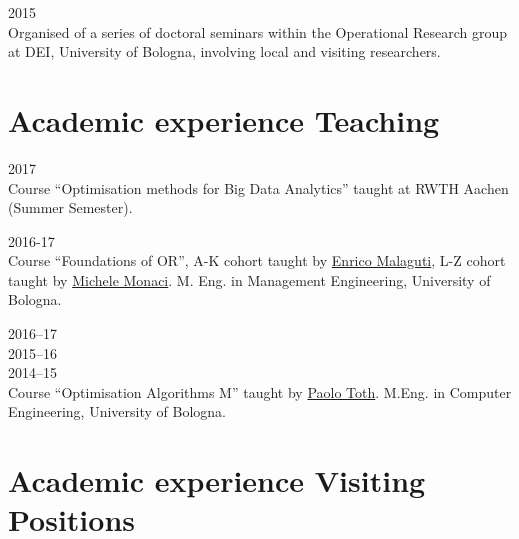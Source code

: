 \begin{paracol}{2}
  \textsc{2015}
\switchcolumn
  \\
  Organised of a series of doctoral seminars within the Operational Research group at DEI, University of Bologna, involving local and visiting researchers.
\end{paracol}

\section*{Academic experience {\small Teaching}}

\begin{paracol}{2}
  \textsc{2017}
\switchcolumn
  \\
  Course ``Optimisation methods for Big Data Analytics'' taught at RWTH Aachen (Summer Semester).
\end{paracol}


\begin{paracol}{2}
  \textsc{2016-17}
\switchcolumn
  \\
  Course ``Foundations of OR'', A-K cohort taught by \href{https://scholar.google.com/citations?user=3nD4vYkAAAAJ}{Enrico Malaguti}, L-Z cohort taught by \href{https://scholar.google.com/citations?user=wORMYBMAAAAJ}{Michele Monaci}. M. Eng. in Management Engineering, University of Bologna.
\end{paracol}

\begin{paracol}{2}
  \textsc{2016--17\\2015--16\\2014--15}
\switchcolumn
  \\
  Course ``Optimisation Algorithms M'' taught by \href{https://scholar.google.com/citations?user=2IPL4XIAAAAJ}{Paolo Toth}. M.Eng. in Computer Engineering, University of Bologna.
\end{paracol}

\section*{Academic experience {\small Visiting Positions}}


